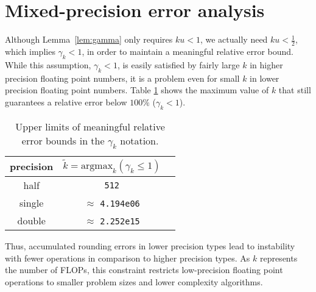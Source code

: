 \section{Mixed-precision error analysis}
Although Lemma~\ref{lem:gamma} only requires $ku<1$, we actually need $ku <\frac{1}{2}$, which implies $\gamma_{k} <1$, in order to maintain a meaningful relative error bound.
While this assumption, $\gamma_{k} < 1$, is easily satisfied by fairly large $k$ in higher precision floating point numbers, it is a problem even for small $k$ in lower precision floating point numbers.
Table \ref{table:ieeen} shows the maximum value of $k$ that still guarantees a relative error below $100\%$ ($\gamma_{k} < 1$). 
\begin{table}[h]
	\centering
	\begin{tabular}{||c|c|c||} 
		\hline
		precision &$\tilde{k} = \mathrm{argmax}_{k}(\gamma_{k} \leq 1)$ \\ \hline
		half & {\tt 512}\\
		single & $\approx$ {\tt 4.194e06} \\ 
		double &  $\approx$ {\tt 2.252e15}\\ \hline 
	\end{tabular}
	\caption{Upper limits of meaningful relative error bounds in the $\gamma_{k}$ notation.}
	\label{table:ieeen}
\end{table}
Thus, accumulated rounding errors in lower precision types lead to instability with fewer operations in comparison to higher precision types.
As $k$ represents the number of FLOPs, this constraint restricts low-precision floating point operations to smaller problem sizes and lower complexity algorithms.




